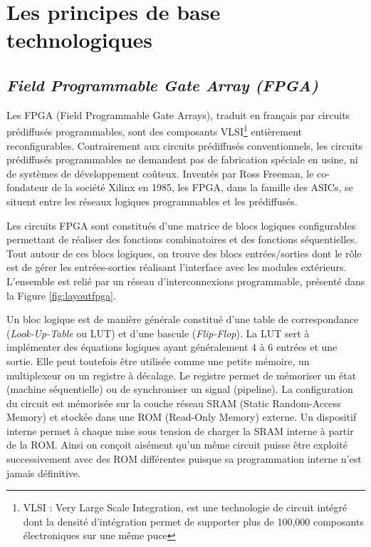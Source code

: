\chapter{Les principes de base technologiques}
\label{chap:principe}
\OnehalfSpacing
\section{\emph{Field Programmable Gate Array (FPGA)}}
\label{sec:fpga}
Les FPGA (Field Programmable Gate Arrays), traduit en français par circuits prédiffusés 
programmables\cite{hubinweb},
sont des composants VLSI\footnote{VLSI : Very Large Scale Integration, est une technologie de circuit intégré dont la densité d'intégration
permet de supporter plus de 100,000 composants électroniques sur une même puce}  
entièrement reconfigurables. Contrairement aux circuits prédiffusés conventionnels, les circuits
prédiffusés programmables ne demandent pas de fabrication spéciale en usine, ni de systèmes de 
développement coûteux. Inventés par Ross Freeman, le co-fondateur de la société Xilinx en 1985, les FPGA, dans la famille
des ASICs, se situent entre les réseaux logiques programmables et les prédiffusés. 

Les circuits FPGA sont constitués d'une matrice de blocs logiques configurables permettant de réaliser des fonctions
combinatoires et des fonctions séquentielles. Tout autour de ces blocs logiques, on trouve des blocs entrées/sorties
dont le rôle est de gérer les entrées-sorties réalisant l'interface avec les modules extérieurs.
L'ensemble est relié par un réseau d'interconnexions programmable, présenté dans la Figure \ref{fig:layoutfpga}. 

Un bloc logique est de manière générale constitué d'une table de correspondance
(\emph{Look-Up-Table} ou LUT) et d'une bascule (\emph{Flip-Flop}). 
La LUT sert à implémenter
des équations logiques ayant généralement 4 à 6 entrées et une sortie. 
Elle peut toutefois être utilisée comme une petite
mémoire, un multiplexeur ou un registre à décalage. 
Le registre permet de mémoriser un état (machine séquentielle) ou
de synchroniser un signal (pipeline).
La configuration du circuit est mémorisée sur la couche réseau SRAM (Static Random-Access Memory) 
et stockée dans une ROM (Read-Only Memory) externe. 
Un dispositif interne permet à chaque mise sous tension de charger la SRAM interne à partir de la ROM. 
Ainsi on conçoit aisément qu'un même circuit puisse être exploité successivement avec des ROM 
différentes puisque sa programmation interne n'est jamais définitive.

